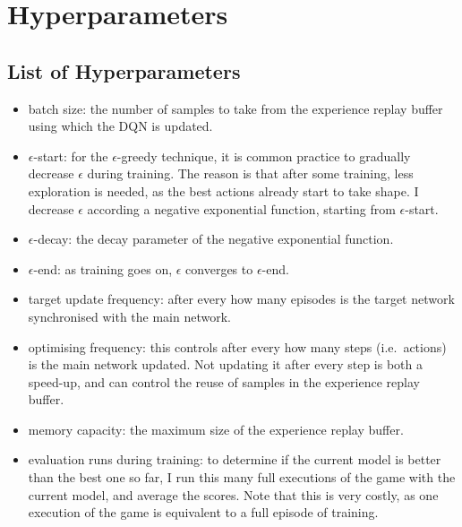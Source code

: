 
\chapter{Hyperparameters}\label{hyperparameters} 


\section{List of Hyperparameters}


\begin{itemize} 
    \item batch size: the number of samples to take from the experience replay buffer using which the DQN is updated.
    
    \item $\epsilon$-start: for the $\epsilon$-greedy technique, it is common practice to gradually decrease $\epsilon$ during training. The reason is that after some training, less exploration is needed, as the best actions already start to take shape. I decrease $\epsilon$ according a negative exponential function, starting from $\epsilon$-start.
    
    \item $\epsilon$-decay: the decay parameter of the negative exponential function.
    
    \item $\epsilon$-end: as training goes on, $\epsilon$ converges to $\epsilon$-end.
     
    
    \item target update frequency: after every how many episodes is the target network synchronised with the main network.
    
    \item optimising frequency: this controls after every how many steps (i.e.\ actions) is the main network updated. Not updating it after every step is both a speed-up, and can control the reuse of samples in the experience replay buffer.
    
    \item memory capacity: the maximum size of the experience replay buffer.
    
    \item evaluation runs during training: to determine if the current model is better than the best one so far, I run this many full executions of the game with the current model, and average the scores. Note that this is very costly, as one execution of the game is equivalent to a full episode of training.
    

\end{itemize}
